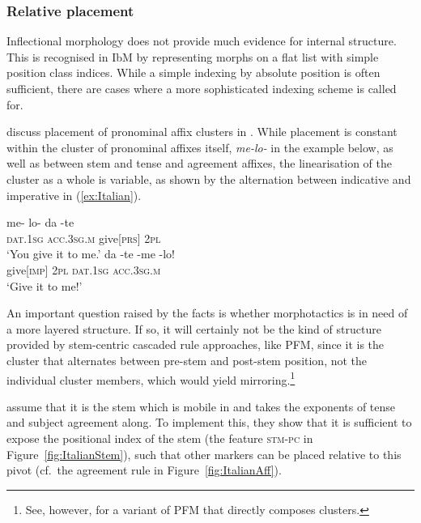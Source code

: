\documentclass[output=paper
	        ,collection
	        ,collectionchapter
 	        ,biblatex
                ,babelshorthands
                ,newtxmath
                ,draftmode
                ,colorlinks, citecolor=brown
]{langscibook}
\begin{document}
\begin{exe}
\begin{xlist}
\begin{exe}
\begin{xlist}
\subsubsection*{Relative placement}

Inflectional morphology does not provide much evidence for internal
structure. This is recognised in IbM by representing morphs on a flat
list with simple position class indices. While a simple indexing by
absolute position is often sufficient, there are cases where a more
sophisticated indexing scheme is called
for.

\citet{Crysmann:Bonami:2016} discuss placement of pronominal affix
clusters in . While placement is constant within the cluster of
pronominal affixes
itself, \textit{me-lo-} in the example below, as well as
between stem and tense and agreement affixes, the linearisation of the
cluster as a whole is variable, as shown by the alternation between
indicative and imperative in (\ref{ex:Italian}).

\begin{exe}
  \ex\label{ex:Italian}
  \begin{xlist}
    \ex\gll me- lo- da -te\\
    \textsc{dat.1sg} \textsc{acc.3sg.m} give[\textsc{prs}] \textsc{2pl}\\
    \glt ‘You give it to me.’
    \ex\gll da -te -me -lo!\\
    give[\textsc{imp}] \textsc{2pl} \textsc{dat.1sg} \textsc{acc.3sg.m}\\
    \glt ‘Give it to me!’
  \end{xlist}
\end{exe}


An important question raised by the  facts is whether
morphotactics is in need of a more layered structure. If so, it will
certainly not be the kind of structure provided by stem-centric
cascaded rule approaches, like PFM, since it is  the cluster that
alternates between pre-stem and post-stem position, not the individual
cluster members, which would yield mirroring.\footnote{See, however, \citet{Spencer05}
for a variant of PFM that directly composes clusters.} 

\citet{Crysmann:Bonami:2016} assume that it is the stem which is
mobile in  and takes the exponents of tense and subject
agreement along. To implement this, they show that it is sufficient to
expose the positional index of the stem (the feature \textsc{stm-pc}
in Figure~\ref{fig:ItalianStem}), such that other markers can
be placed relative to this pivot (cf.~the agreement rule in Figure~\ref{fig:ItalianAff}).  


\end{xlist}
\end{exe}
\end{xlist}
\end{exe}
\end{document}
